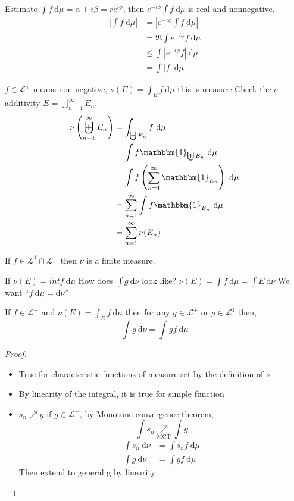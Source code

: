 \begin{remark}
  Estimate $\int f \ \mathrm{d}\mu = \alpha + i\beta = re^{i \phi}$, then
  $e^{-i\phi} \int f \ \mathrm{d}\mu$ is real and nonnegative.
  \begin{align*}
    \left|\int f \ \mathrm{d}\mu\right| &= \left|e^{-i\phi} \int f \ \mathrm{d}\mu\right| \\
    &= \Re \int e^{-i\phi}f \ \mathrm{d}\mu \\
    &\le \int |e^{-i\phi}f| \ \mathrm{d}\mu \\
    &= \int |f| \ \mathrm{d}\mu
  \end{align*}
\end{remark}

$f \in \mathcal{L}^+$ means non-negative, $\nu(E) = \int_E f \ \mathrm{d}\mu$ this is measure
Check the $\sigma$-additivity
$E = \biguplus_{n=1}^\infty E_n$, 
\begin{align*}
  \nu\left(\biguplus_{n=1}^\infty E_n\right) &= \int_{\biguplus E_n} f \ \mathrm{d}\mu \\
  &= \int f \mathbbm{1}_{\biguplus E_n} \ \mathrm{d}\mu \\
  &= \int f \left(\sum_{n=1}^\infty \mathbbm{1}_{E_n}\right) \ \mathrm{d}\mu \\
  &= \sum_{n=1}^\infty \int f \mathbbm{1}_{E_n} \ \mathrm{d}\mu \\
  &= \sum_{n=1}^\infty \nu(E_n)
\end{align*}

\begin{claim}
  If $f \in \mathcal{L}^1 \cap \mathcal{L}^+$ then $\nu$ is a finite measure.
\end{claim}

If $\nu(E) = int f  \ \mathrm{d}\mu$
How does $\int g \ \mathrm{d}\nu$ look like?
$\nu(E) = \int f \ \mathrm{d}\mu = \int E \ \mathrm{d}\nu$
We want ``$f\ \mathrm{d}\mu = \mathrm{d}\nu$''
\begin{lemma}
  If $f \in \mathcal{L}^+$ and $\nu(E) = \int_E f \ \mathrm{d}\mu$ then for any $g \in \mathcal{L}^+$ or $g \in \mathcal{L}^1$ then,   
  \[\int g\ \mathrm{d}\nu = \int g f \ \mathrm{d}\mu\]
\end{lemma}

\begin{proof}
  \begin{itemize}
    \item True for characteristic functions of measure set by the definition of $\nu$  
    \item By linearity of the integral, it is true for simple function
    \item  $s_n\nearrow g$ if $g \in \mathcal{L}^+$, by Monotone convergence theorem, 
    \[\int s_n \underset{\text{MCT}}\nearrow \int g\]
    \begin{align*}
      \int s_n \ \mathrm{d}\nu &= \int s_n f \ \mathrm{d}\mu \\
      \int g \ \mathrm{d}\nu &= \int g f \ \mathrm{d}\mu
    \end{align*}
    Then extend to general g by linearity
  \end{itemize}
\end{proof}

